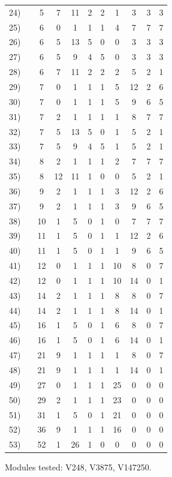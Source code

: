 \begin{longtable}{rc|ccccccccc}
24) &  & 5 & 7 & 11 & 2 & 2 & 1 & 3 & 3 & 3 \\
25) &  & 6 & 0 & 1 & 1 & 1 & 4 & 7 & 7 & 7 \\
26) &  & 6 & 5 & 13 & 5 & 0 & 0 & 3 & 3 & 3 \\
27) &  & 6 & 5 & 9 & 4 & 5 & 0 & 3 & 3 & 3 \\
28) &  & 6 & 7 & 11 & 2 & 2 & 2 & 5 & 2 & 1 \\
29) &  & 7 & 0 & 1 & 1 & 1 & 5 & 12 & 2 & 6 \\
30) &  & 7 & 0 & 1 & 1 & 1 & 5 & 9 & 6 & 5 \\
31) &  & 7 & 2 & 1 & 1 & 1 & 1 & 8 & 7 & 7 \\
32) &  & 7 & 5 & 13 & 5 & 0 & 1 & 5 & 2 & 1 \\
33) &  & 7 & 5 & 9 & 4 & 5 & 1 & 5 & 2 & 1 \\
34) &  & 8 & 2 & 1 & 1 & 1 & 2 & 7 & 7 & 7 \\
35) &  & 8 & 12 & 11 & 1 & 0 & 0 & 5 & 2 & 1 \\
36) &  & 9 & 2 & 1 & 1 & 1 & 3 & 12 & 2 & 6 \\
37) &  & 9 & 2 & 1 & 1 & 1 & 3 & 9 & 6 & 5 \\
38) &  & 10 & 1 & 5 & 0 & 1 & 0 & 7 & 7 & 7 \\
39) &  & 11 & 1 & 5 & 0 & 1 & 1 & 12 & 2 & 6 \\
40) &  & 11 & 1 & 5 & 0 & 1 & 1 & 9 & 6 & 5 \\
41) &  & 12 & 0 & 1 & 1 & 1 & 10 & 8 & 0 & 7 \\
42) &  & 12 & 0 & 1 & 1 & 1 & 10 & 14 & 0 & 1 \\
43) &  & 14 & 2 & 1 & 1 & 1 & 8 & 8 & 0 & 7 \\
44) &  & 14 & 2 & 1 & 1 & 1 & 8 & 14 & 0 & 1 \\
45) &  & 16 & 1 & 5 & 0 & 1 & 6 & 8 & 0 & 7 \\
46) &  & 16 & 1 & 5 & 0 & 1 & 6 & 14 & 0 & 1 \\
47) &  & 21 & 9 & 1 & 1 & 1 & 1 & 8 & 0 & 7 \\
48) &  & 21 & 9 & 1 & 1 & 1 & 1 & 14 & 0 & 1 \\
49) &  & 27 & 0 & 1 & 1 & 1 & 25 & 0 & 0 & 0 \\
50) &  & 29 & 2 & 1 & 1 & 1 & 23 & 0 & 0 & 0 \\
51) &  & 31 & 1 & 5 & 0 & 1 & 21 & 0 & 0 & 0 \\
52) &  & 36 & 9 & 1 & 1 & 1 & 16 & 0 & 0 & 0 \\
53) &  & 52 & 1 & 26 & 1 & 0 & 0 & 0 & 0 & 0 \\
\end{longtable}
\noindent Modules tested: V248, V3875, V147250.\\

